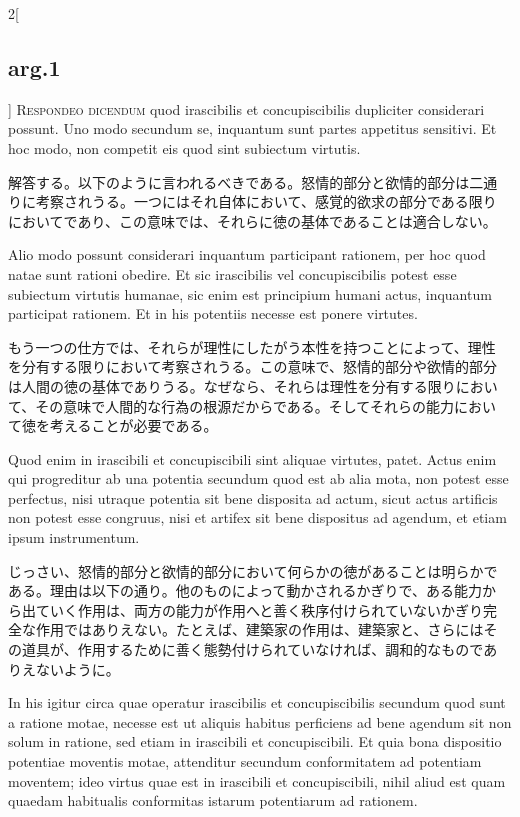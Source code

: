 \documentclass[paper=a4paper,fontsize=10pt,jafontsize=9pt,titlepage]{jlreq}
\begin{document}
\begin{paracol}{2}[\subsection{arg.1}]
{\scshape Respondeo dicendum} quod irascibilis et concupiscibilis
dupliciter considerari possunt. Uno modo secundum se, inquantum sunt
partes appetitus sensitivi. Et hoc modo, non competit eis quod sint
subiectum virtutis.

\switchcolumn

解答する。以下のように言われるべきである。怒情的部分と欲情的部分は二通
りに考察されうる。一つにはそれ自体において、感覚的欲求の部分である限り
においてであり、この意味では、それらに徳の基体であることは適合しない。

\switchcolumn*

Alio modo possunt considerari inquantum participant rationem, per hoc
quod natae sunt rationi obedire. Et sic irascibilis vel
concupiscibilis potest esse subiectum virtutis humanae, sic enim est
principium humani actus, inquantum participat rationem. Et in his
potentiis necesse est ponere virtutes.

\switchcolumn

もう一つの仕方では、それらが理性にしたがう本性を持つことによって、理性
を分有する限りにおいて考察されうる。この意味で、怒情的部分や欲情的部分
は人間の徳の基体でありうる。なぜなら、それらは理性を分有する限りにおい
て、その意味で人間的な行為の根源だからである。そしてそれらの能力におい
て徳を考えることが必要である。

\switchcolumn*

Quod enim in irascibili et concupiscibili sint aliquae virtutes,
patet. Actus enim qui progreditur ab una potentia secundum quod est ab
alia mota, non potest esse perfectus, nisi utraque potentia sit bene
disposita ad actum, sicut actus artificis non potest esse congruus,
nisi et artifex sit bene dispositus ad agendum, et etiam ipsum
instrumentum.

\switchcolumn

じっさい、怒情的部分と欲情的部分において何らかの徳があることは明らかで
ある。理由は以下の通り。他のものによって動かされるかぎりで、ある能力か
ら出ていく作用は、両方の能力が作用へと善く秩序付けられていないかぎり完
全な作用ではありえない。たとえば、建築家の作用は、建築家と、さらにはそ
の道具が、作用するために善く態勢付けられていなければ、調和的なものであ
りえないように。

\switchcolumn*

In his igitur circa quae operatur irascibilis et concupiscibilis
secundum quod sunt a ratione motae, necesse est ut aliquis habitus
perficiens ad bene agendum sit non solum in ratione, sed etiam in
irascibili et concupiscibili. Et quia bona dispositio potentiae
moventis motae, attenditur secundum conformitatem ad potentiam
moventem; ideo virtus quae est in irascibili et concupiscibili, nihil
aliud est quam quaedam habitualis conformitas istarum potentiarum ad
rationem.


\end{paracol}
\end{document}

